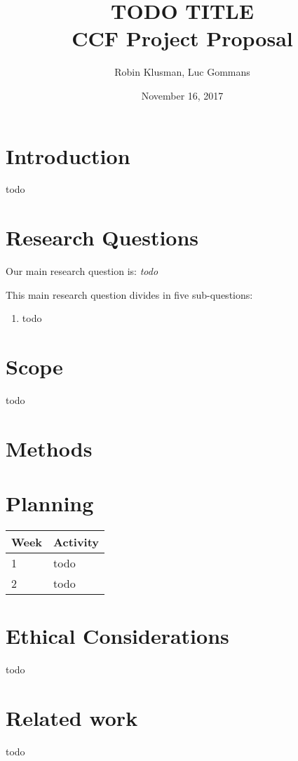 \documentclass{article}
\title{TODO TITLE \\
	\vspace{0.3cm}
	{\large CCF Project Proposal}
}
\date{November 16, 2017}
\author{Robin Klusman, Luc Gommans}
\begin{document}
\maketitle

\section{Introduction}

todo


\section{Research Questions}

Our main research question is:
{\it todo}

\vspace{0.5cm}

This main research question divides in five sub-questions:

\begin{enumerate}
	\item todo 
\end{enumerate}


\section{Scope}

todo


\section{Methods}




\section{Planning}

\begin{tabular}[H]{ | l | p{10.2cm} | }
	\hline
	\textbf{Week} & \textbf{Activity} \\
	\hline 1 & todo \\
	\hline 2 & todo \\
	\hline
\end{tabular}


\section{Ethical Considerations}

todo


\section{Related work}

todo


\printbibliography
\end{document}
